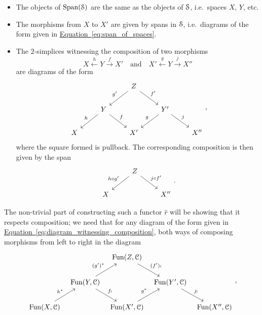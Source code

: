 \documentclass[main.tex]{subfiles}
\begin{document}
\begin{itemize}
  \item The objects of $\Span(\S)$ are the same as the objects of $\S$, i.e.\ spaces $X$, $Y$, etc.

  \item The morphisms from $X$ to $X'$ are given by spans in $\S$, i.e.\ diagrams of the form given in \hyperref[eq:span_of_spaces]{Equation~\ref*{eq:span_of_spaces}}.

  \item The $2$-simplices witnessing the composition of two morphisms
    \begin{equation*}
      X \overset{h}{\leftarrow} Y \overset{f}{\rightarrow} X' \quad\text{and}\quad X' \overset{g}{\leftarrow} Y \overset{j}{\rightarrow} X''
    \end{equation*}
    are diagrams of the form
    \begin{equation}
      \label{eq:diagram_witnessing_composition}
      \begin{tikzcd}
        && Z
        \arrow[dl, swap, "g'"]
        \arrow[dr, "f'"]
        \\
        & Y
        \arrow[dl, swap, "h"]
        \arrow[dr, "f"]
        && Y'
        \arrow[dl, swap, "g"]
        \arrow[dr, "j"]
        \\
        X
        && X'
        && X''
      \end{tikzcd},
    \end{equation}
    where the square formed is pullback. The corresponding composition is then given by the span
    \begin{equation*}
      \begin{tikzcd}
        & Z
        \arrow[dl, swap, "h \circ g'"]
        \arrow[dr, "j \circ f'"]
        \\
        X
        && X''
      \end{tikzcd}.
    \end{equation*}
\end{itemize}
The non-trivial part of constructing such a functor $\hat{r}$ will be showing that it respects composition; we need that for any diagram of the form given in \hyperref[eq:diagram_witnessing_composition]{Equation~\ref*{eq:diagram_witnessing_composition}}, both ways of composing morphisms from left to right in the diagram
\begin{equation*}
  \begin{tikzcd}[column sep=tiny]
    && \Fun(Z, \category{C})
    \arrow[dr, "(f')_{!}"]
    \\
    & \Fun(Y, \category{C})
    \arrow[ur, "(g')^{*}"]
    \arrow[dr, "f_{!}"]
    && \Fun(Y', \category{C})
    \arrow[dr, "j_{!}"]
    \\
    \Fun(X, \category{C})
    \arrow[ur, "h^{*}"]
    && \Fun(X', \category{C})
    \arrow[ur, "g^{*}"]
    && \Fun(X'', \category{C})
  \end{tikzcd},
\end{equation*}
\end{document}
